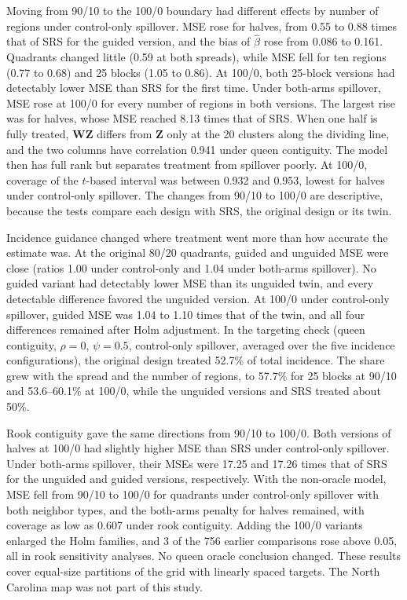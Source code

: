 \documentclass[11pt]{article}
\begin{document}
Moving from 90/10 to the 100/0 boundary had different effects by number of regions under control-only spillover. MSE rose for halves, from 0.55 to 0.88 times that of SRS for the guided version, and the bias of \(\hat\beta\) rose from 0.086 to 0.161. Quadrants changed little (0.59 at both spreads), while MSE fell for ten regions (0.77 to 0.68) and 25 blocks (1.05 to 0.86). At 100/0, both 25-block versions had detectably lower MSE than SRS for the first time. Under both-arms spillover, MSE rose at 100/0 for every number of regions in both versions. The largest rise was for halves, whose MSE reached 8.13 times that of SRS. When one half is fully treated, \(\mathbf{W}\mathbf{Z}\) differs from \(\mathbf{Z}\) only at the 20 clusters along the dividing line, and the two columns have correlation 0.941 under queen contiguity. The model then has full rank but separates treatment from spillover poorly. At 100/0, coverage of the \(t\)-based interval was between 0.932 and 0.953, lowest for halves under control-only spillover. The changes from 90/10 to 100/0 are descriptive, because the tests compare each design with SRS, the original design or its twin.

Incidence guidance changed where treatment went more than how accurate the estimate was. At the original 80/20 quadrants, guided and unguided MSE were close (ratios 1.00 under control-only and 1.04 under both-arms spillover). No guided variant had detectably lower MSE than its unguided twin, and every detectable difference favored the unguided version. At 100/0 under control-only spillover, guided MSE was 1.04 to 1.10 times that of the twin, and all four differences remained after Holm adjustment. In the targeting check (queen contiguity, \(\rho = 0\), \(\psi = 0.5\), control-only spillover, averaged over the five incidence configurations), the original design treated 52.7\% of total incidence. The share grew with the spread and the number of regions, to 57.7\% for 25 blocks at 90/10 and 53.6--60.1\% at 100/0, while the unguided versions and SRS treated about 50\%.

Rook contiguity gave the same directions from 90/10 to 100/0. Both versions of halves at 100/0 had slightly higher MSE than SRS under control-only spillover. Under both-arms spillover, their MSEs were 17.25 and 17.26 times that of SRS for the unguided and guided versions, respectively. With the non-oracle model, MSE fell from 90/10 to 100/0 for quadrants under control-only spillover with both neighbor types, and the both-arms penalty for halves remained, with coverage as low as 0.607 under rook contiguity. Adding the 100/0 variants enlarged the Holm families, and 3 of the 756 earlier comparisons rose above 0.05, all in rook sensitivity analyses. No queen oracle conclusion changed. These results cover equal-size partitions of the grid with linearly spaced targets. The North Carolina map was not part of this study.
\end{document}
